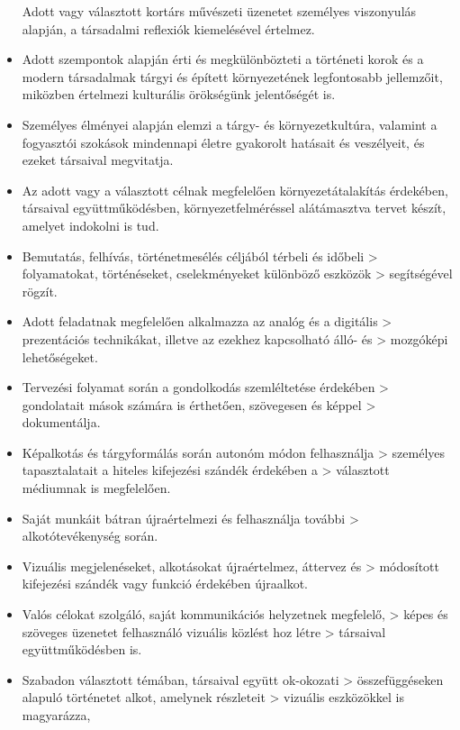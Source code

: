 \begin{itemize}
  Adott vagy választott kortárs művészeti üzenetet személyes viszonyulás
  alapján, a társadalmi reflexiók kiemelésével értelmez.
\item
  Adott szempontok alapján érti és megkülönbözteti a történeti korok és
  a modern társadalmak tárgyi és épített környezetének legfontosabb
  jellemzőit, miközben értelmezi kulturális örökségünk jelentőségét is.
\item
  Személyes élményei alapján elemzi a tárgy- és környezetkultúra,
  valamint a fogyasztói szokások mindennapi életre gyakorolt hatásait és
  veszélyeit, és ezeket társaival megvitatja.
\item
  Az adott vagy a választott célnak megfelelően környezetátalakítás
  érdekében, társaival együttműködésben, környezetfelméréssel
  alátámasztva tervet készít, amelyet indokolni is tud.
\item
  Bemutatás, felhívás, történetmesélés céljából térbeli és időbeli
  \textgreater{} folyamatokat, történéseket, cselekményeket különböző
  eszközök \textgreater{} segítségével rögzít.
\item
  Adott feladatnak megfelelően alkalmazza az analóg és a digitális
  \textgreater{} prezentációs technikákat, illetve az ezekhez
  kapcsolható álló- és \textgreater{} mozgóképi lehetőségeket.
\item
  Tervezési folyamat során a gondolkodás szemléltetése érdekében
  \textgreater{} gondolatait mások számára is érthetően, szövegesen és
  képpel \textgreater{} dokumentálja.
\item
  Képalkotás és tárgyformálás során autonóm módon felhasználja
  \textgreater{} személyes tapasztalatait a hiteles kifejezési szándék
  érdekében a \textgreater{} választott médiumnak is megfelelően.
\item
  Saját munkáit bátran újraértelmezi és felhasználja további
  \textgreater{} alkotótevékenység során.
\item
  Vizuális megjelenéseket, alkotásokat újraértelmez, áttervez és
  \textgreater{} módosított kifejezési szándék vagy funkció érdekében
  újraalkot.
\item
  Valós célokat szolgáló, saját kommunikációs helyzetnek megfelelő,
  \textgreater{} képes és szöveges üzenetet felhasználó vizuális közlést
  hoz létre \textgreater{} társaival együttműködésben is.
\item
  Szabadon választott témában, társaival együtt ok-okozati
  \textgreater{} összefüggéseken alapuló történetet alkot, amelynek
  részleteit \textgreater{} vizuális eszközökkel is magyarázza,

\end{itemize}
